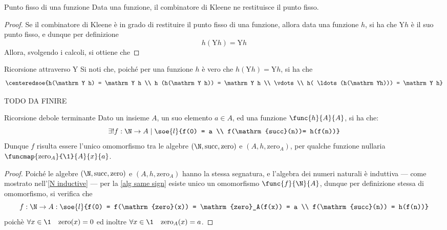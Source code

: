 \documentclass[a4paper, 12pt]{report}
\begin{document}
    \begin{framedprop}{Punto fisso di una funzione}
        Data una funzione, il combinatore di Kleene ne restituisce il punto fisso.
    \end{framedprop}

    \begin{proof}
        Se il combinatore di Kleene è in grado di restituire il punto fisso di una funzione, allora data una funzione $h$, si ha che $\mathrm Yh$ è il suo punto fisso, e dunque per definizione $$h(\mathrm Yh) = \mathrm Yh$$ Allora, svolgendo i calcoli, si ottiene che 
    \end{proof}

    \begin{framedobs}{Ricorsione attraverso $\mathrm Y$}
        Si noti che, poiché per una funzione $h$ è vero che $h(\mathrm Yh) = \mathrm Y h$, si ha che $$\centeredsoe{h(\mathrm Y h) = \mathrm Y h \\ h (h(\mathrm Y h)) = \mathrm Y h \\ \vdots \\ h( \ldots (h(\mathrm Yh))) = \mathrm Y h}$$

        TODO DA FINIRE
    \end{framedobs}

    \begin{framedlem}[label={weak term ric}]{Ricorsione debole terminante}
        Dato un insieme $A$, un suo elemento $a \in A$, ed una funzione $\func{h}{A}{A}$, si ha che: $$\exists ! f: \N \to A \mid \soe{l}{f(0) = a \\ f(\mathrm{succ}(n))= h(f(n))}$$ Dunque $f$ risulta essere l'unico omomorfismo tra le algebre $(\N, \mathrm{succ}, \mathrm{zero})$ e $(A, h, \mathrm{zero}_A)$, per qualche funzione nullaria $\funcmap{\mathrm{zero}_A}{\1}{A}{x}{a}$.
    \end{framedlem}

    \begin{proof}
        Poiché le algebre $(\N, \mathrm{succ}, \mathrm{zero})$ e $(A, h, \mathrm{zero}_A)$ hanno la stessa segnatura, e l'algebra dei numeri naturali è induttiva --- come mostrato nell'\cref{N inductive} --- per la \cref{alg same sign} esiste unico un omomorfismo $\func{f}{\N}{A}$, dunque per definizione stessa di omomorfismo, si verifica che $$f:\N \to A :\soe{l}{f(0) = f(\mathrm{zero}(x)) = \mathrm{zero}_A(f(x)) = a \\ f(\mathrm{succ}(n)) = h(f(n))}$$ poichè $\forall x \in \1 \quad \mathrm{zero}(x) = 0$ ed inoltre $\forall x \in \1 \quad \mathrm{zero}_A(x) = a$.
    \end{proof}
\end{document}
